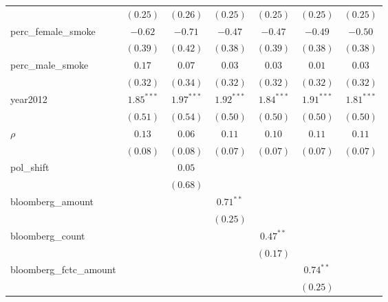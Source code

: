 \begin{table}[!h]
\begin{center}
\begin{tabular}{l c c c c c c }
                        & $(0.25)$     & $(0.26)$     & $(0.25)$     & $(0.25)$     & $(0.25)$     & $(0.25)$     \\
perc\_female\_smoke     & $-0.62$      & $-0.71$      & $-0.47$      & $-0.47$      & $-0.49$      & $-0.50$      \\
                        & $(0.39)$     & $(0.42)$     & $(0.38)$     & $(0.39)$     & $(0.38)$     & $(0.38)$     \\
perc\_male\_smoke       & $0.17$       & $0.07$       & $0.03$       & $0.03$       & $0.01$       & $0.03$       \\
                        & $(0.32)$     & $(0.34)$     & $(0.32)$     & $(0.32)$     & $(0.32)$     & $(0.32)$     \\
year2012                & $1.85^{***}$ & $1.97^{***}$ & $1.92^{***}$ & $1.84^{***}$ & $1.91^{***}$ & $1.81^{***}$ \\
                        & $(0.51)$     & $(0.54)$     & $(0.50)$     & $(0.50)$     & $(0.50)$     & $(0.50)$     \\
$\rho$                  & $0.13$       & $0.06$       & $0.11$       & $0.10$       & $0.11$       & $0.11$       \\
                        & $(0.08)$     & $(0.08)$     & $(0.07)$     & $(0.07)$     & $(0.07)$     & $(0.07)$     \\
pol\_shift              &              & $0.05$       &              &              &              &              \\
                        &              & $(0.68)$     &              &              &              &              \\
bloomberg\_amount       &              &              & $0.71^{**}$  &              &              &              \\
                        &              &              & $(0.25)$     &              &              &              \\
bloomberg\_count        &              &              &              & $0.47^{**}$  &              &              \\
                        &              &              &              & $(0.17)$     &              &              \\
bloomberg\_fctc\_amount &              &              &              &              & $0.74^{**}$  &              \\
                        &              &              &              &              & $(0.25)$     &              \\

\end{tabular}
\end{center}
\end{table}
